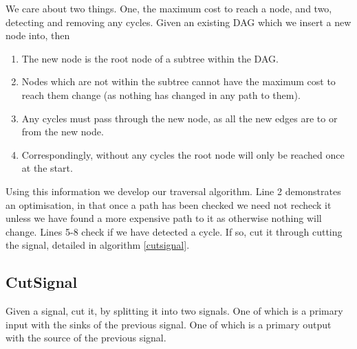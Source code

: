 \documentclass[12pt,final,oneside]{article} %
\begin{document}
We care about two things. One, the maximum cost to reach a node, and two, detecting and removing any cycles.
Given an existing \ac{DAG}  which we insert a new node into, then
\begin{enumerate}
   \item The new node is the root node of a subtree within the \ac{DAG}.
   \item Nodes which are not within the subtree cannot have the maximum cost to reach them change (as nothing has changed in any path to them).
   \item Any cycles must pass through the new node, as all the new edges are to or from the new node.
   \item Correspondingly, without any cycles the root node will only be reached once at the start.
\end{enumerate}
Using this information we develop our traversal algorithm.
Line 2 demonstrates an optimisation, in that once a path has been checked we need not recheck it unless we have found a more expensive path to it as otherwise nothing will change.
Lines 5-8 check if we have detected a cycle. If so, cut it through cutting the signal, detailed in algorithm \ref{cutsignal}.


\newpage
\subsection{CutSignal}
Given a signal, cut it, by splitting it into two signals. One of which is a primary input with the sinks of the previous signal. One of which is a primary output with the source of the previous signal.
\end{document}
